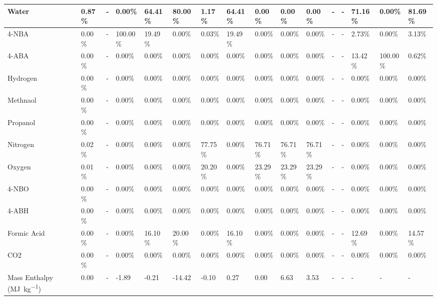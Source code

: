 \begin{landscape}
\begin{table}[H]
\begin{tabular}{|l|l|l|l|l|l|l|l|l|l|l|l|l|l|l|l|}
Water                   & 0.87\%  & -    & 0.00\%   & 64.41\% & 80.00\% & 1.17\%  & 64.41\% & 0.00\%  & 0.00\%  & 0.00\%  & -    & -    & 71.16\% & 0.00\%   & 81.69\% \\ \hline
4-NBA                   & 0.00\%  & -    & 100.00\% & 19.49\% & 0.00\%  & 0.03\%  & 19.49\% & 0.00\%  & 0.00\%  & 0.00\%  & -    & -    & 2.73\%  & 0.00\%   & 3.13\%  \\ \hline
4-ABA                   & 0.00\%  & -    & 0.00\%   & 0.00\%  & 0.00\%  & 0.00\%  & 0.00\%  & 0.00\%  & 0.00\%  & 0.00\%  & -    & -    & 13.42\% & 100.00\% & 0.62\%  \\ \hline
Hydrogen                & 0.00\%  & -    & 0.00\%   & 0.00\%  & 0.00\%  & 0.00\%  & 0.00\%  & 0.00\%  & 0.00\%  & 0.00\%  & -    & -    & 0.00\%  & 0.00\%   & 0.00\%  \\ \hline
Methnaol                & 0.00\%  & -    & 0.00\%   & 0.00\%  & 0.00\%  & 0.00\%  & 0.00\%  & 0.00\%  & 0.00\%  & 0.00\%  & -    & -    & 0.00\%  & 0.00\%   & 0.00\%  \\ \hline
Propanol                & 0.00\%  & -    & 0.00\%   & 0.00\%  & 0.00\%  & 0.00\%  & 0.00\%  & 0.00\%  & 0.00\%  & 0.00\%  & -    & -    & 0.00\%  & 0.00\%   & 0.00\%  \\ \hline
Nitrogen                & 0.02\%  & -    & 0.00\%   & 0.00\%  & 0.00\%  & 77.75\% & 0.00\%  & 76.71\% & 76.71\% & 76.71\% & -    & -    & 0.00\%  & 0.00\%   & 0.00\%  \\ \hline
Oxygen                  & 0.01\%  & -    & 0.00\%   & 0.00\%  & 0.00\%  & 20.20\% & 0.00\%  & 23.29\% & 23.29\% & 23.29\% & -    & -    & 0.00\%  & 0.00\%   & 0.00\%  \\ \hline
4-NBO                   & 0.00\%  & -    & 0.00\%   & 0.00\%  & 0.00\%  & 0.00\%  & 0.00\%  & 0.00\%  & 0.00\%  & 0.00\%  & -    & -    & 0.00\%  & 0.00\%   & 0.00\%  \\ \hline
4-ABH                   & 0.00\%  & -    & 0.00\%   & 0.00\%  & 0.00\%  & 0.00\%  & 0.00\%  & 0.00\%  & 0.00\%  & 0.00\%  & -    & -    & 0.00\%  & 0.00\%   & 0.00\%  \\ \hline
Formic Acid             & 0.00\%  & -    & 0.00\%   & 16.10\% & 20.00\% & 0.00\%  & 16.10\% & 0.00\%  & 0.00\%  & 0.00\%  & -    & -    & 12.69\% & 0.00\%   & 14.57\% \\ \hline
CO2                     & 0.00\%  & -    & 0.00\%   & 0.00\%  & 0.00\%  & 0.00\%  & 0.00\%  & 0.00\%  & 0.00\%  & 0.00\%  & -    & -    & 0.00\%  & 0.00\%   & 0.00\%  \\ \hline
Mass Enthalpy (\si{\mega\J\per\kg})    & 0.00    & -    & -1.89    & -0.21   & -14.42  & -0.10   & 0.27    & 0.00    & 6.63    & 3.53    & -    & -    & -       & -        & -       \\ \hline
\end{tabular}
\end{table}


\end{landscape}
